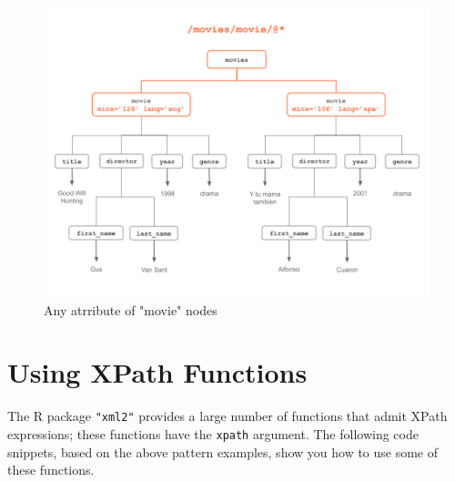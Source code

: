 \documentclass[
]{book}
\begin{document}
\begin{figure}

{\centering \includegraphics[width=0.85\linewidth]{images/xpath/xpath-example11} 

}

\caption{Any atrribute of "movie" nodes}\label{fig:unnamed-chunk-61}
\end{figure}

\hypertarget{using-xpath-functions}{%
\section{Using XPath Functions}\label{using-xpath-functions}}

The R package \texttt{"xml2"} provides a large number of functions that admit
XPath expressions; these functions have the \texttt{xpath} argument. The following
code snippets, based on the above pattern examples, show you how to use
some of these functions.
\end{document}
